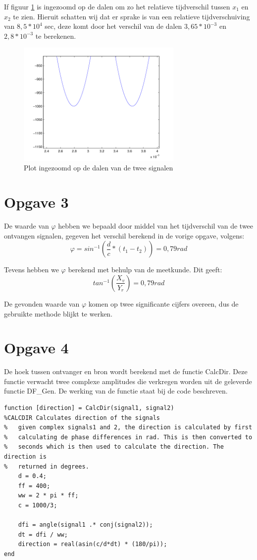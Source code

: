 \documentclass{article}
\begin{document}
If figuur \ref{2b} is ingezoomd op de dalen om zo het relatieve tijdverschil
tussen $x_1$ en $x_2$ te zien. Hieruit schatten wij dat er sprake is van een
relatieve tijdverschuiving van $8,5*10^4$ sec, deze komt
door het verschil van de dalen $3,65*10^{-3}$ en $2,8*10^{-3}$ te berekenen.

\begin{figure}[h]
	\begin{center}
	\includegraphics[width = 8cm]{2b.png}
	\caption{Plot ingezoomd op de dalen van de twee signalen}
	\end{center}
 \label{2b}
\end{figure}

\newpage
\section{Opgave 3}
De waarde van \begin{math}\varphi\end{math} hebben we bepaald door middel van het tijdverschil van de twee ontvangen signalen, gegeven het verschil berekend in de vorige opgave, volgens:
$$\varphi = sin^{-1}(\frac{d}{c} * (t_{1} - t_{2})) = 0,79 rad$$

Tevens hebben we $\varphi$ berekend met behulp van de meetkunde. Dit geeft:
$$tan^{-1} (\frac{X_{v}}{Y_{r}}) = 0,79rad$$

De gevonden waarde van $\varphi$ komen op twee significante cijfers overeen, dus de gebruikte methode blijkt te werken.

\section{Opgave 4}

De hoek tussen ontvanger en bron wordt berekend met de functie CalcDir. Deze functie verwacht twee complexe amplitudes die verkregen worden uit de geleverde functie DF\_Gen. De werking van de functie staat bij de code beschreven. 
\begin{lstlisting}
function [direction] = CalcDir(signal1, signal2)
%CALCDIR Calculates direction of the signals
%   given complex signals1 and 2, the direction is calculated by first
%   calculating de phase differences in rad. This is then converted to
%   seconds which is then used to calculate the direction. The direction is
%   returned in degrees.
    d = 0.4;
    ff = 400;
    ww = 2 * pi * ff;
    c = 1000/3;
    
    dfi = angle(signal1 .* conj(signal2));
    dt = dfi / ww;
    direction = real(asin(c/d*dt) * (180/pi));
end
\end{lstlisting}
\end{document}
